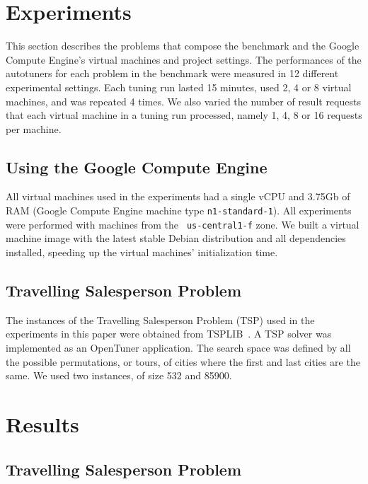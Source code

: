 \documentclass[a4paper, 12pt]{article}
\begin{document}
\section{Experiments} \label{sec:exp}

This section describes the problems that compose the benchmark and the Google
Compute Engine's virtual machines and project settings.  The performances of
the autotuners for each problem in the benchmark were measured in 12 different
experimental settings. Each tuning run lasted 15 minutes, used 2, 4 or 8
virtual machines, and was repeated 4 times.  We also varied the number of
result requests that each virtual machine in a tuning run processed, namely 1,
4, 8 or 16 requests per machine.

\subsection{Using the Google Compute Engine}

All virtual machines used in the experiments had a single vCPU and 3.75Gb of
RAM (Google Compute Engine machine type \texttt{\footnotesize n1-standard-1}).
All experiments were performed with machines from the \texttt{\footnotesize
us-central1-f} zone. We built a virtual machine image with the latest stable
Debian distribution and all dependencies installed, speeding up the virtual
machines' initialization time.

\subsection{Travelling Salesperson Problem}

The instances of the Travelling Salesperson Problem (TSP) used in the
experiments in this paper were obtained from TSPLIB~\cite{reinelt1991tsplib}.
A TSP solver was implemented as an OpenTuner application. The search space was
defined by all the possible permutations, or tours, of cities where the first
and last cities are the same. We used two instances, of size 532 and 85900.

\section{Results} \label{sec:results}


\subsection{Travelling Salesperson Problem}
\end{document}
